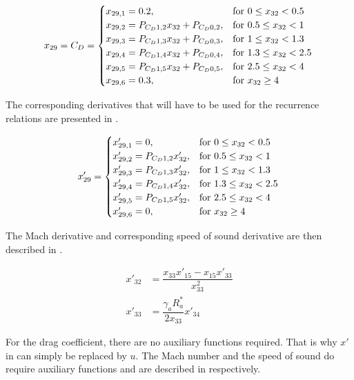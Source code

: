 \begin{equation}\label{eq:cdCond}
x_{29}=C_{D}=\begin{cases}
x_{29,1}=0.2, & \text{for } 0\leq x_{32} < 0.5\\
x_{29,2}=P_{C_{D} 1,2}x_{32}+P_{C_{D} 0,2}, &  \text{for } 0.5\leq x_{32} < 1 \\
x_{29,3}=P_{C_{D} 1,3}x_{32}+P_{C_{D} 0,3}, &  \text{for } 1\leq x_{32} < 1.3 \\
x_{29,4}=P_{C_{D} 1,4}x_{32}+P_{C_{D} 0,4}, &  \text{for } 1.3\leq x_{32} < 2.5 \\
x_{29,5}=P_{C_{D} 1,5}x_{32}+P_{C_{D} 0,5}, &  \text{for } 2.5\leq x_{32} < 4 \\
x_{29,6}=0.3, &  \text{for } x_{32} \geq 4 
\end{cases}\\
\end{equation}

The corresponding derivatives that will have to be used for the recurrence relations are presented in .

\begin{equation}\label{eq:cdCondDer}
x'_{29}=\begin{cases}
x'_{29,1}=0, & \text{for } 0\leq x_{32} < 0.5\\
x'_{29,2}=P_{C_{D} 1,2}x'_{32}, &  \text{for } 0.5\leq x_{32} < 1 \\
x'_{29,3}=P_{C_{D} 1,3}x'_{32}, &  \text{for } 1\leq x_{32} < 1.3 \\
x'_{29,4}=P_{C_{D} 1,4}x'_{32}, &  \text{for } 1.3\leq x_{32} < 2.5 \\
x'_{29,5}=P_{C_{D} 1,5}x'_{32}, &  \text{for } 2.5\leq x_{32} < 4 \\
x'_{29,6}=0, &  \text{for } x_{32} \geq 4 
\end{cases}\\
\end{equation}

The Mach derivative and corresponding speed of sound derivative are then described in .

 \begin{equation} \label{eq:cdDerAux}
\begin{split}
x'_{32} &= \dfrac{x_{33}x'_{15}-x_{15}x'_{33}}{x_{33}^{2}}\\
x'_{33} &= \dfrac{\gamma_{a}R_{a}^{*}}{2x_{33}}x'_{34} 
\end{split}
\end{equation}

For the drag coefficient, there are no auxiliary functions required. That is why $x'$ in  can simply be replaced by $u$. The Mach number and the speed of sound do require auxiliary functions and are described in  respectively.

